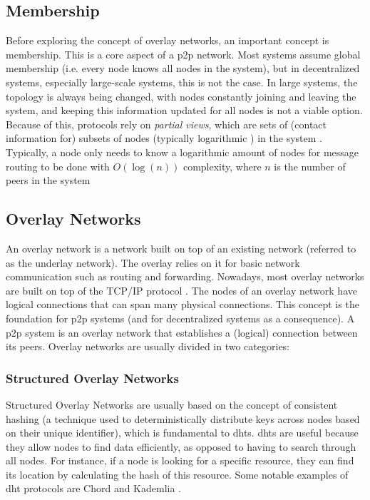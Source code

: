 \subsection{Membership}
\label{ssec:membership}

Before exploring the concept of overlay networks, an important concept is membership. This is a core aspect of a \gls{p2p} network. Most systems assume global membership (i.e. every node knows all nodes in the system), but in decentralized systems, especially large-scale systems, this is not the case. In large systems, the topology is always being changed, with nodes constantly joining and leaving the system, and keeping this information updated for all nodes is not a viable option. Because of this, protocols rely on \textit{partial views}\cite{Kermarrec2003, Leitao2007}, which are sets of (contact information for) subsets of nodes (typically logarithmic \cite{Leitao2010}) in the system \cite{Leitao2007}. Typically, a node only needs to know a logarithmic amount of nodes for message routing to be done with $O(\log(n))$ complexity, where $n$ is the number of peers in the system \cite{Rowstron2001}
\subsection*{Overlay Networks}
\label{ssec:overlay_networks}

An overlay network is a network built on top of an existing network (referred to as the underlay network). The overlay relies on it for basic network communication such as routing and forwarding. Nowadays, most overlay networks are built on top of the TCP/IP protocol \cite{Tarkoma2010}. The nodes of an overlay network have logical connections that can span many physical connections. This concept is the foundation for \gls{p2p} systems (and for decentralized systems as a consequence). A \gls{p2p} system is an overlay network that establishes a (logical) connection between its peers. Overlay networks are usually divided in two categories:

\subsubsection*{Structured Overlay Networks}
\label{sssec:structured_overlay_networks}

Structured Overlay Networks are usually based on the concept of consistent hashing (a technique used to deterministically distribute keys across nodes based on their unique identifier), which is fundamental to \glspl{dht}. \glspl{dht} are useful because they allow nodes to find data efficiently, as opposed to having to search through all nodes. For instance, if a node is looking for a specific resource, they can find its location by calculating the hash of this resource. Some notable examples of \gls{dht} protocols are Chord \cite{Chord2003} and Kademlia \cite{Kademlia2002}.


